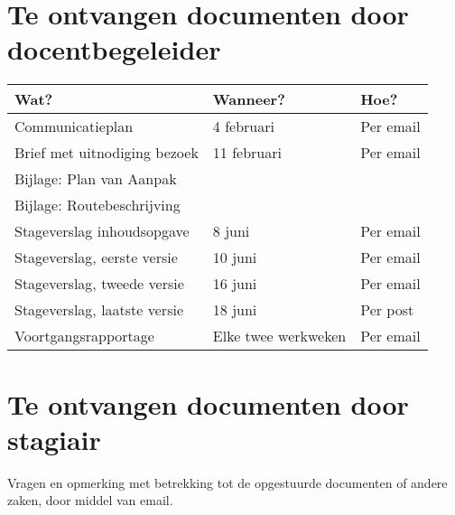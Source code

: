 \section{Te ontvangen documenten door docentbegeleider}

\begin{tabularx}{\textwidth}{|X|l|l|}
\hline
Wat?&Wanneer?&Hoe?\\
\hline
Communicatieplan&4 februari&Per email\\
\hline
Brief met uitnodiging bezoek&11 februari&Per email\\
Bijlage: Plan van Aanpak&&\\
Bijlage: Routebeschrijving&&\\
\hline
Stageverslag inhoudsopgave&8 juni&Per email\\
\hline
Stageverslag, eerste versie&10 juni&Per email\\
\hline
Stageverslag, tweede versie&16 juni&Per email\\
\hline
Stageverslag, laatste versie&18 juni&Per post\\
\hline
Voortgangsrapportage&Elke twee werkweken&Per email\\
\hline
\end{tabularx}

\section{Te ontvangen documenten door stagiair}

Vragen en opmerking met betrekking tot de opgestuurde documenten of andere zaken, door middel van email.
